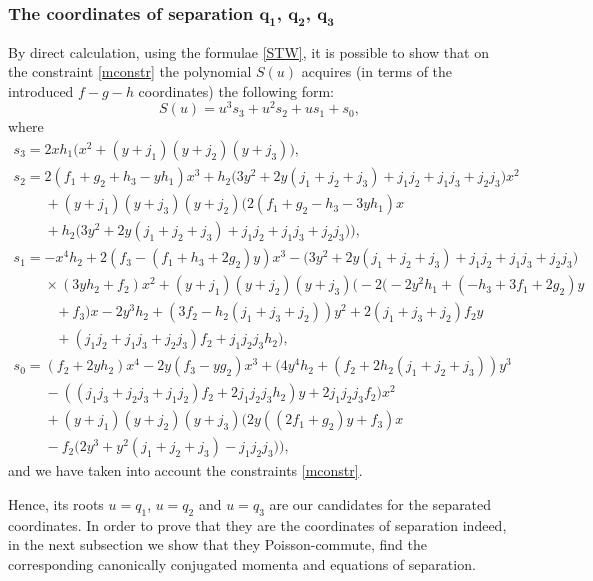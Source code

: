 \documentclass[10pt,a4paper]{amsart}
\numberwithin{equation}{section}
\begin{document}
\subsubsection[The coordinates of separation q\_1, q\_2, q\_3]{The coordinates of separation $\boldsymbol{q_1}$, $\boldsymbol{q_2}$, $\boldsymbol{q_3}$}
By direct calculation, using the formulae \eqref{STW}, it is possible to show that on the constraint \eqref{mconstr} the polynomial $S(u)$ acquires (in terms of the introduced $f-g-h$ coordinates) the following form:
\begin{equation}\label{Su}
S(u)= u^3 s_3+ u^2 s_2+ u s_1+ s_0,
\end{equation}
where
\begin{subequations}\label{Si}
\begin{gather}
s_3= 2 x h_1\bigl(x^2+(y+j_1)(y+j_2)(y+j_3)\bigr),
\\
s_2= 2(f_1+g_2+h_3 -y h_1) x^3 + h_2 \big(3 y^2+2 y (j_1+j_2+j_3)+j_1 j_2+j_1 j_3+j_2 j_3\big) x^2 \nonumber\\
\phantom{s_2=}{}+
 (y+j_1)(y+j_3)(y+j_2)\big(2(f_1+g_2-h_3-3 y h_1)x \nonumber\\
\phantom{s_2=}{}+ h_2\big(3y^2+2y (j_1+j_2+j_3)+j_1 j_2+j_1j_3+j_2j_3\big)\big),
\\
s_1= -x^4 h_2+2( f_3 -(f_1+ h_3+2 g_2)y) x^3- \big(3 y^2+2 y (j_1+j_2+j_3)+j_1 j_2+j_1 j_3+j_2 j_3\big)\nonumber
\\
\phantom{s_1=}{}\times(3 y h_2+f_2) x^2+(y+j_1) (y+j_2) (y+j_3)
\bigl(-2\big(-2y^2 h_1+(-h_3+3f_1+2g_2)y\nonumber
\\
\phantom{s_1=\times}{}+f_3 \big)x -2y^3h_2+(3f_2-h_2(j_1+j_3+j_2))y^2
+2(j_1+j_3+j_2)f_2y\nonumber
\\
\phantom{s_1=\times}{}+(j_1j_2+j_1j_3+j_2j_3)f_2+j_1 j_2 j_3 h_2\bigr),
\\
s_0= (f_2+2 y h_2) x^4-2 y (f_3-y g_2) x^3+ \bigl( 4y^4 h_2+(f_2+2h_2(j_1+j_2+j_3))y^3\nonumber
\\
\phantom{s_1=}{} -((j_1j_3+j_2j_3+j_1j_2)f_2
+2j_1j_2j_3 h_2)y+2j_1j_2j_3 f_2\bigr) x^2\nonumber
\\
\phantom{s_1=}{} + (y+j_1)(y+j_2)(y+j_3)\bigl(2 y((2f_1+g_2) y +f_3)x \nonumber
\\
\phantom{s_1=}{}
 -f_2 \big(2 y^3+y^2( j_1+j_2+j_3)-j_1 j_2 j_3\big)\bigr),
\end{gather}
\end{subequations}
and we have taken into account the constraints \eqref{mconstr}.


Hence, its roots $u=q_1$, $u=q_2$ and $u=q_3$
are our candidates for the separated coordinates. In order to prove that they are the coordinates of separation indeed, in the next subsection we show that they Poisson-commute, find the corresponding canonically conjugated momenta and equations of separation.
\end{document}
